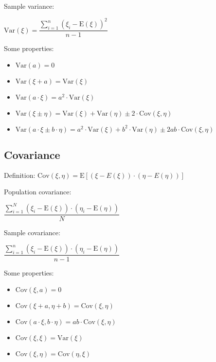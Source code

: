 \documentclass[10pt, a4paper, landscape]{article}
\newcommand{\E}{\mathrm{E}}
\newcommand{\Var}{\mathrm{Var}}
\newcommand{\Cov}{\mathrm{Cov}}
\begin{document}
\begin{multicols}{3}
\begin{multicols}{2}
			\columnbreak
			
			Sample variance:
			
			\begin{center}
				$\Var(\xi) = \dfrac{\sum_{i=1}^{n} (\xi_{i} - \E(\xi))^2}{n - 1}$
			\end{center}
		\end{multicols}
		
		Some properties:
		
		\begin{itemize}[leftmargin=*]
			\item $\Var(a) = 0$
			\item $\Var(\xi + a) = \Var(\xi)$
			\item $\Var(a \cdot \xi) = a^{2} \cdot \Var(\xi)$
			\item $\Var(\xi \pm \eta) = \Var(\xi) + \Var(\eta) \pm 2 \cdot \Cov(\xi, \eta)$
			\item $\Var(a \cdot \xi \pm b \cdot \eta) = a^{2} \cdot \Var(\xi) + b^{2} \cdot \Var(\eta) \pm 2 a b \cdot \Cov(\xi, \eta)$
		\end{itemize}
		
		\subsection*{Covariance}
		
		Definition: \quad $\Cov(\xi, \eta) = \E[(\xi - E(\xi)) \cdot (\eta - E(\eta))]$
		
		\begin{multicols}{2}
			Population covariance:
			
			\begin{center}
				$\dfrac{\sum_{i=1}^{N} (\xi_{i} - \E(\xi)) \cdot (\eta_{i} - \E(\eta))}{N}$
			\end{center}
			
			\columnbreak
			
			Sample covariance:
			
			\begin{center}
				$\dfrac{\sum_{i=1}^{n} (\xi_{i} - \E(\xi)) \cdot (\eta_{i} - \E(\eta))}{n - 1}$
			\end{center}
		\end{multicols}
		
		Some properties:
		
		\begin{itemize}[leftmargin=*]
			\item $\Cov(\xi, a) = 0$
			\item $\Cov(\xi + a, \eta + b) = \Cov(\xi, \eta)$
			\item $\Cov(a \cdot \xi, b \cdot \eta) = a b \cdot \Cov(\xi, \eta)$
			\item $\Cov(\xi, \xi) = \Var(\xi)$
			\item $\Cov(\xi, \eta) = \Cov(\eta, \xi)$
		\end{itemize}
		

\end{multicols}
\end{document}
